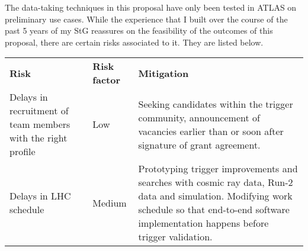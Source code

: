 The data-taking techniques in this proposal have only been tested in ATLAS on preliminary use cases. 
While the experience that I built over the course of the past 5 years of my StG reassures on the feasibility of the outcomes of this proposal, there are certain risks associated to it. %
They are listed below.  
\begin{center}%
\begin{tabular}{p{60mm}p{}p{85mm}}
\toprule
\midrule
\textbf{Risk} & \textbf{Risk factor} &  \textbf{Mitigation} \\
Delays in recruitment of team members with the right profile & Low & Seeking candidates within the trigger community, announcement of vacancies earlier than or soon after signature of grant agreement. \\
Delays in LHC schedule & Medium & Prototyping trigger improvements and searches with cosmic ray data, Run-2 data and simulation. Modifying work schedule so that end-to-end software implementation happens before trigger validation.\\
\bottomrule
\end{tabular}
\end{center}

\clearpage
\begingroup

    \linespread{0.9}\selectfont

\endgroup
  

